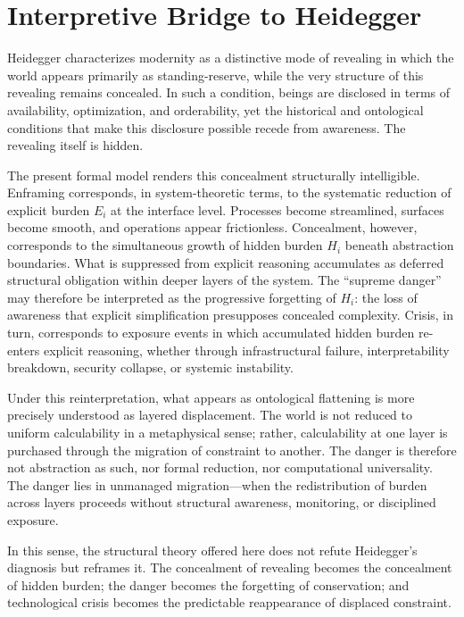 \documentclass[11pt,openany]{book}
\begin{document}
\section{Interpretive Bridge to Heidegger}

Heidegger characterizes modernity as a distinctive mode of revealing in which 
the world appears primarily as standing-reserve, while the very structure of this 
revealing remains concealed. In such a condition, beings are disclosed in terms 
of availability, optimization, and orderability, yet the historical and ontological 
conditions that make this disclosure possible recede from awareness. The revealing 
itself is hidden.

The present formal model renders this concealment structurally intelligible. 
Enframing corresponds, in system-theoretic terms, to the systematic reduction 
of explicit burden $E_i$ at the interface level. Processes become streamlined, 
surfaces become smooth, and operations appear frictionless. Concealment, however, 
corresponds to the simultaneous growth of hidden burden $H_i$ beneath abstraction 
boundaries. What is suppressed from explicit reasoning accumulates as deferred 
structural obligation within deeper layers of the system. The ``supreme danger'' 
may therefore be interpreted as the progressive forgetting of $H_i$: the loss of 
awareness that explicit simplification presupposes concealed complexity. Crisis, 
in turn, corresponds to exposure events in which accumulated hidden burden 
re-enters explicit reasoning, whether through infrastructural failure, 
interpretability breakdown, security collapse, or systemic instability.

Under this reinterpretation, what appears as ontological flattening is more 
precisely understood as layered displacement. The world is not reduced to 
uniform calculability in a metaphysical sense; rather, calculability at one 
layer is purchased through the migration of constraint to another. The 
danger is therefore not abstraction as such, nor formal reduction, nor 
computational universality. The danger lies in unmanaged migration—when 
the redistribution of burden across layers proceeds without structural 
awareness, monitoring, or disciplined exposure.

In this sense, the structural theory offered here does not refute Heidegger's 
diagnosis but reframes it. The concealment of revealing becomes the concealment 
of hidden burden; the danger becomes the forgetting of conservation; and 
technological crisis becomes the predictable reappearance of displaced constraint.
\end{document}

